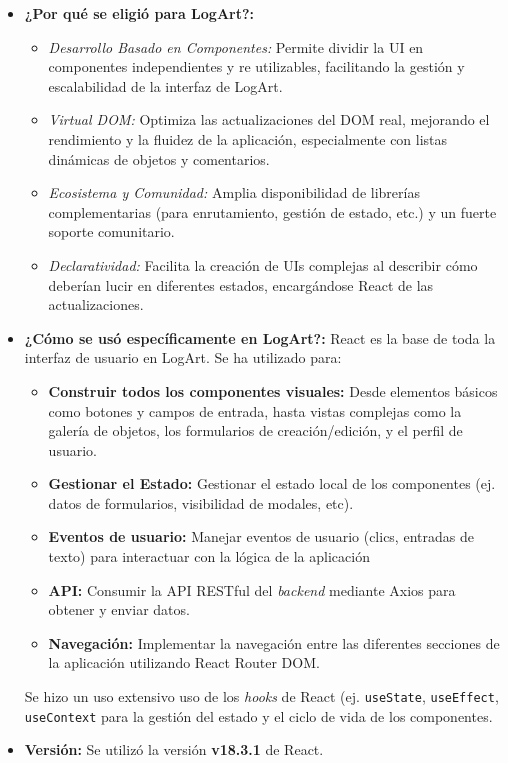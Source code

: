 \begin{itemize}
        \item \textbf{¿Por qué se eligió para LogArt?:}
        \begin{itemize}
            \item \textit{Desarrollo Basado en Componentes:} Permite dividir la UI en componentes independientes y re utilizables, facilitando la gestión y escalabilidad de la interfaz de LogArt.
            \item \textit{Virtual DOM:} Optimiza las actualizaciones del DOM real, mejorando el rendimiento y la fluidez de la aplicación, especialmente con listas dinámicas de objetos y comentarios.
            \item \textit{Ecosistema y Comunidad:} Amplia disponibilidad de librerías complementarias (para enrutamiento, gestión de estado, etc.) y un fuerte soporte comunitario.
            \item \textit{Declaratividad:} Facilita la creación de UIs complejas al describir cómo deberían lucir en diferentes estados, encargándose React de las actualizaciones.
        \end{itemize}
    \item \textbf{¿Cómo se usó específicamente en LogArt?:} React es la base de toda la interfaz de usuario en LogArt. Se ha utilizado para:
        \begin{itemize}
            \item \textbf{Construir todos los componentes visuales:} Desde elementos básicos como botones y campos de entrada, hasta vistas complejas como la galería de objetos, los formularios de creación/edición, y el perfil de usuario.
            \item \textbf{Gestionar el Estado:} Gestionar el estado local de los componentes (ej. datos de formularios, visibilidad de modales, etc).
            \item \textbf{Eventos de usuario:} Manejar eventos de usuario (clics, entradas de texto) para interactuar con la lógica de la aplicación
            \item \textbf{API:} Consumir la API RESTful del \textit{backend} mediante Axios para obtener y enviar datos.
            \item \textbf{Navegación:} Implementar la navegación entre las diferentes secciones de la aplicación utilizando React Router DOM.
        \end{itemize}
    Se hizo un uso extensivo uso de los \textit{hooks} de React (ej. \texttt{useState}, \texttt{useEffect}, \texttt{useContext} para la gestión del estado y el ciclo de vida de los componentes.
    \item \textbf{Versión:} Se utilizó la versión \textbf{v18.3.1} de React.
\end{itemize}

